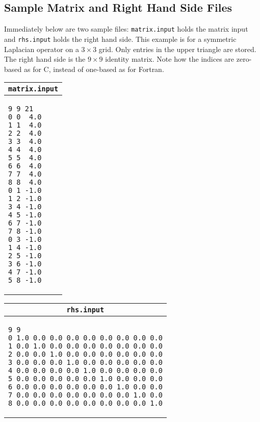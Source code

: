 \subsection{Sample Matrix and Right Hand Side Files}
\label{subsection:serial:input-files}
\par
Immediately below are two sample files:
{\tt matrix.input} holds the matrix input
and {\tt rhs.input} holds the right hand side.
This example is for a symmetric Laplacian operator 
on a $3 \times 3$ grid.
Only entries in the upper triangle are stored.
The right hand side is the $9 \times 9$ identity matrix.
Note how the indices are zero-based as for C, instead of one-based
as for Fortran.
\begin{center}
\begin{tabular}{|l|}
\multicolumn{1}{c}{\tt matrix.input} \\ \hline
\begin{minipage}[t]{0.75 in}
\begin{verbatim}
9 9 21
0 0  4.0
1 1  4.0
2 2  4.0
3 3  4.0
4 4  4.0
5 5  4.0
6 6  4.0
7 7  4.0
8 8  4.0
0 1 -1.0
1 2 -1.0
3 4 -1.0
4 5 -1.0
6 7 -1.0
7 8 -1.0
0 3 -1.0
1 4 -1.0
2 5 -1.0
3 6 -1.0
4 7 -1.0
5 8 -1.0
\end{verbatim}
\end{minipage}
\\ \hline
\end{tabular}
\qquad
\begin{tabular}{|l|}
\multicolumn{1}{c}{\tt rhs.input} \\ \hline
\begin{minipage}[t]{2.75 in}
\begin{verbatim}
9 9
0 1.0 0.0 0.0 0.0 0.0 0.0 0.0 0.0 0.0
1 0.0 1.0 0.0 0.0 0.0 0.0 0.0 0.0 0.0
2 0.0 0.0 1.0 0.0 0.0 0.0 0.0 0.0 0.0
3 0.0 0.0 0.0 1.0 0.0 0.0 0.0 0.0 0.0
4 0.0 0.0 0.0 0.0 1.0 0.0 0.0 0.0 0.0
5 0.0 0.0 0.0 0.0 0.0 1.0 0.0 0.0 0.0
6 0.0 0.0 0.0 0.0 0.0 0.0 1.0 0.0 0.0
7 0.0 0.0 0.0 0.0 0.0 0.0 0.0 1.0 0.0
8 0.0 0.0 0.0 0.0 0.0 0.0 0.0 0.0 1.0
\end{verbatim}
\end{minipage}
\\ \hline
\end{tabular}
\end{center}
\par
